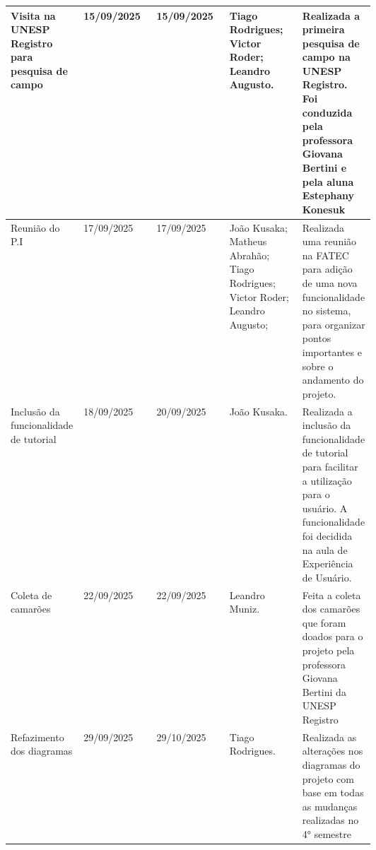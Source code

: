 \documentclass[
landscape,
  a4paper,
  12pt,
  english,
  brazilian,
]{article}
\begin{document}
 \begin{table}[]
\centering


\begin{tabular}{|>{\raggedright\arraybackslash}p{0.2\linewidth}|l|l|>{\raggedright\arraybackslash}p{0.2\linewidth}|>{\raggedright\arraybackslash}p{0.2\linewidth}|}

\hline

Visita na UNESP Registro para pesquisa de campo& 15/09/2025& 15/09/2025&  Tiago Rodrigues; Victor Roder; Leandro Augusto. &Realizada a primeira pesquisa de campo na UNESP Registro. Foi conduzida pela professora Giovana Bertini e pela aluna Estephany Konesuk\\\hline
 Reunião do P.I& 17/09/2025& 17/09/2025& João Kusaka; Matheus Abrahão; Tiago Rodrigues; Victor Roder; Leandro Augusto;& Realizada uma reunião na FATEC para adição de uma nova funcionalidade no sistema, para organizar pontos importantes e sobre o andamento do projeto.\\\hline
 Inclusão da funcionalidade de tutorial& 18/09/2025& 20/09/2025& João Kusaka.&Realizada a inclusão da funcionalidade de tutorial para facilitar a utilização para o usuário. A funcionalidade foi decidida na aula de Experiência de Usuário.\\ \hline 
 Coleta de camarões& 22/09/2025& 22/09/2025& Leandro Muniz. &Feita a coleta dos camarões que foram doados para o projeto pela professora Giovana Bertini da UNESP Registro\\\hline
                  Refazimento dos diagramas&                            29/09/2025&                29/10/2025&                 Tiago Rodrigues.&                                  Realizada as alterações nos diagramas do projeto com base em todas as mudanças realizadas no 4° semestre\\ \hline 

\end{tabular}


\end{table}
\end{document}
